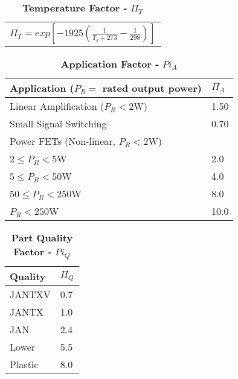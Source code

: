 \begin{table}
\caption{\textbf{Temperature Factor -} $\Pi_{T}$}
\label{table:tempFactorMosLow}
\begin{tabular}{l} \hline
$\Pi_{T} = exp[-1925(\frac{1}{T_j + 273} - \frac{1}{298})]$ \\
\end{tabular}
\end{table}


\begin{table}
\caption{\textbf{Application Factor -}  $Pi_{A}$}
\label{table:baseFailRateMosLow}
\begin{tabular}{|l|m{10cm}|} \hline
\textbf{Application} ($P_{R} = $ rated output power) & $\Pi_{A}$ \\ \hline
Linear Amplification  ($P_{R} < 2$W) & 1.50 \\
Small Signal Switching & 0.70 \\ \hline
Power FETs (Non-linear, $P_{R} < 2$W) & \\
$2 \leq P_{R} < 5$W & 2.0 \\ 
$5 \leq P_{R} < 50$W & 4.0 \\ 
$50 \leq P_{R} < 250$W & 8.0 \\ 
$P_{R} < 250$W & 10.0 \\ 
\end{tabular}
\end{table}


\begin{table}
\caption{\textbf{Part Quality  Factor -}  $Pi_{Q}$}
\label{table:baseFailRateMosLow}
\begin{tabular}{|l|m{10cm}|} \hline
\textbf{Quality} & $\Pi_{Q}$ \\ \hline
JANTXV & 0.7 \\ \hline
JANTX & 1.0 \\ \hline
JAN & 2.4 \\ \hline
Lower & 5.5 \\ \hline
Plastic & 8.0 \\ \hline
\end{tabular}
\end{table}


